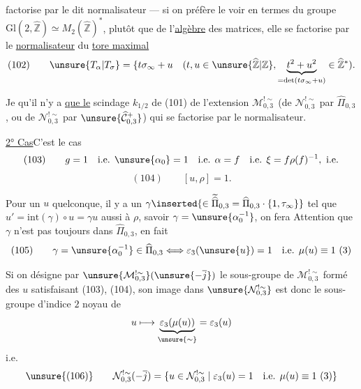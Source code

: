 
factorise par le dit normalisateur --- si on préfère le voir en termes du
groupe $\mathrm{Gl}(2,\widehat{\mathbb Z})\simeq M_2(\widehat{\mathbb Z})^*$,
plutôt que de l'\uline{algèbre} des matrices, elle se factorise par
le \uline{normalisateur} du \uline{tore maximal}
\[
 (102)\qquad
 \unsure{T_\alpha|T_\sigma}=
 \{t\sigma_\infty+u\quad
 (t,u\in\unsure{\widehat{\mathbb Z}|\mathbb Z},
 \underbrace{t^2+u^2}_{=\det(t\sigma_\infty+u)}
 \in\widehat{\mathbb Z}^{*}).
\]

Je  qu'il n'y a \uline{que le} scindage $k_{1/2}$ de (101)
de l'extension $\mathcal M_{0,3}^{!\sim}$
(de $\mathcal N_{0,3}^{!\sim}$ par $\widehat{\Pi}_{0,3}$,
 ou de $\mathcal N_{0,3}^{!\sim}$
par $\unsure{\widehat{\mathcal C}_{0,3}^{+}}$)
qui se factorise par le normalisateur.


\uline{2° Cas}\quad C'est le cas
\[
 (103)\qquad
 g=1\quad\text{i.e. }\unsure{\alpha_0}=1
 \quad\text{i.e. }\alpha=f
 \quad\text{i.e. }\xi=f\rho(f)^{-1},\ \text{i.e.}
\]
\[
 (104)\qquad [u,\rho]=1.
\]

Pour un $u$ quelconque, il y a un
$\gamma\inserted{\in\widetilde{\widehat{\Pi}}_{0,3}
=\widehat{\Pi}_{0,3}\cdot\{1,\tau_\infty\}}$
 tel que
$u'=\mathrm{int}(\gamma)\circ u=\gamma u$
 aussi à $\rho$,
savoir $\gamma=\unsure{\alpha_0^{-1}}$,
 on fera Attention que
$\gamma$ n'est pas toujours dans $\widehat{\Pi}_{0,3}$, en fait
\[
 (105)\qquad
 \gamma=\unsure{\alpha_0^{-1}}\in\widehat{\Pi}_{0,3}
 \Longleftrightarrow
 \varepsilon_3(\unsure{u})=1
 \quad\text{i.e. }\mu(u)\equiv1\ (3)
\]


Si on désigne par
$\unsure{\mathcal M_{0,3}^{!\sim}}(\unsure{-\overline{j}})$
le sous-groupe de $\mathcal M_{0,3}^{!\sim}$
formé des $u$ satisfaisant (103), (104), son image dans
$\unsure{\mathcal N_{0,3}^{!\sim}}$ est donc
 le sous-groupe d'indice $2$ noyau de
\[
 u\longmapsto
 \underbrace{\varepsilon_3(\mu(u))}_{\unsure{\sim}}
 =\varepsilon_3(u)
\]
i.e.
\[
 \unsure{(106)}\qquad
 \mathcal N_{0,3}^{!\sim}(-\overline{j})
 =\{u\in\mathcal N_{0,3}^{!\sim}\mid
 \varepsilon_3(u)=1\quad
 \text{i.e. }\mu(u)\equiv1\ (3)\}
\]

